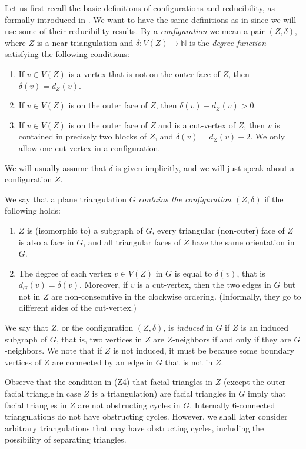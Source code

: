 \documentclass[10pt,a4paper]{article}
\begin{document}
Let us first recall the basic definitions of configurations and reducibility, as formally introduced in \cite{AllaireSwart78}. 
We want to have the same definitions as in \cite{AllaireSwart78,RSST,steinberger2010unavoidable} since we will use some of their reducibility results. By a \emph{configuration} we mean a pair $(Z,\delta)$, where $Z$ is a near-triangulation and $\delta: V(Z)\to {\mathbb N}$ is the \emph{degree function} satisfying the following conditions:
\begin{enumerate}
  \item[\rm (Z1)] If $v\in V(Z)$ is a vertex that is not on the outer face of $Z$, then $\delta(v)=d_Z(v)$.
  \item[\rm (Z2)] If $v\in V(Z)$ is on the outer face of $Z$, then $\delta(v) - d_Z(v) >0$. 
  \item[\rm (Z3)] If $v\in V(Z)$ is on the outer face of $Z$ and is a cut-vertex of $Z$, then
  $v$ is contained in precisely two blocks of $Z$, and
  $\delta(v)=d_Z(v)+2$. We only allow one cut-vertex in a configuration. 
\end{enumerate}
We will usually assume that $\delta$ is given implicitly, and we will just speak about a configuration $Z$.


We say that a plane triangulation $G$ \emph{contains the configuration $(Z,\delta)$} if the following holds:
\begin{enumerate}
  \item[\rm (Z4)] $Z$ 
  is (isomorphic to) a subgraph of $G$, every triangular {(non-outer)} face of $Z$ is also a face in $G$, and all triangular faces of $Z$ have the same orientation in $G$.

\item[\rm (Z5)] The degree of each vertex $v\in V(Z)$ in $G$ is equal to $\delta(v)$, that is $d_G(v)=\delta(v)$. Moreover, if $v$ is a cut-vertex, then the two edges in $G$ but not in $Z$ are non-consecutive in the clockwise ordering. (Informally, they go to different sides of the cut-vertex.)
\end{enumerate}
We say that $Z$, or the configuration $(Z,\delta)$, is \emph{induced} in $G$ if $Z$ is an induced subgraph of $G$, that is, two vertices in $Z$ are $Z$-neighbors if and only if they are $G$-neighbors. We note that if $Z$ is not induced, it must be because some boundary vertices of $Z$ are connected by an edge in $G$ that is not in $Z$.

Observe that the condition in (Z4) that
facial triangles in $Z$ (except the outer facial triangle in case $Z$ is a triangulation) are facial triangles in $G$ imply that facial triangles in $Z$ are not obstructing cycles in $G$. Internally 6-connected triangulations do not have obstructing cycles. 
However, we shall later consider arbitrary triangulations that may have
obstructing cycles, including the possibility of separating triangles.
\end{document}
